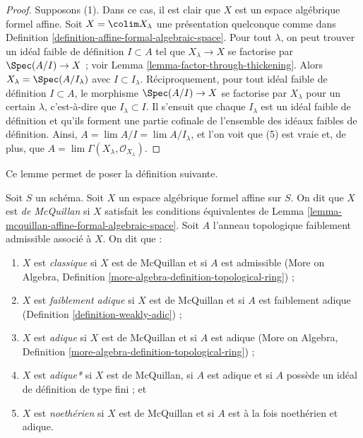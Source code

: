 \begin{proof}
\medskip\noindent
Supposons (1). Dans ce cas, il est clair que $X$ est un espace algébrique
formel affine. Soit $X = \colim X_\lambda$ une présentation quelconque comme dans
Definition \ref{definition-affine-formal-algebraic-space}.
Pour tout $\lambda$, on peut trouver un idéal faible de définition
$I \subset A$ tel que $X_\lambda \to X$ se factorise par
$\Spec(A/I) \to X$ ; voir Lemma \ref{lemma-factor-through-thickening}.
Alors $X_\lambda = \Spec(A/I_\lambda)$ avec $I \subset I_\lambda$.
Réciproquement, pour tout idéal faible de définition $I \subset A$,
le morphisme $\Spec(A/I) \to X$ se factorise par $X_\lambda$
pour un certain $\lambda$, c'est-à-dire que $I_\lambda \subset I$.
Il s'ensuit que chaque $I_\lambda$ est un idéal faible de définition
et qu'ils forment une partie cofinale de l'ensemble des idéaux faibles
de définition. Ainsi, $A = \lim A/I = \lim A/I_\lambda$,
et l'on voit que (5) est vraie et, de plus, que
$A = \lim \Gamma(X_\lambda, \mathcal{O}_{X_\lambda})$.
\end{proof}

\noindent
Ce lemme permet de poser la définition suivante.

\begin{definition}
\label{definition-types-affine-formal-algebraic-space}
Soit $S$ un schéma. Soit $X$ un espace algébrique formel affine sur $S$.
On dit que $X$ est {\it de McQuillan} si $X$ satisfait les conditions équivalentes
de Lemma \ref{lemma-mcquillan-affine-formal-algebraic-space}. Soit $A$
l'anneau topologique faiblement admissible associé à $X$. On dit que :
\begin{enumerate}
\item $X$ est {\it classique} si $X$ est de McQuillan et si $A$ est admissible
(More on Algebra, Definition \ref{more-algebra-definition-topological-ring}) ;
\item $X$ est {\it faiblement adique} si $X$ est de McQuillan et si $A$ est faiblement adique
(Definition \ref{definition-weakly-adic}) ;
\item $X$ est {\it adique} si $X$ est de McQuillan et si $A$ est adique
(More on Algebra, Definition \ref{more-algebra-definition-topological-ring}) ;
\item $X$ est {\it adique*} si $X$ est de McQuillan, si $A$ est adique et si $A$
possède un idéal de définition de type fini ; et
\item $X$ est {\it noethérien} si $X$ est de McQuillan et si $A$ est
à la fois noethérien et adique.
\end{enumerate}
\end{definition}

